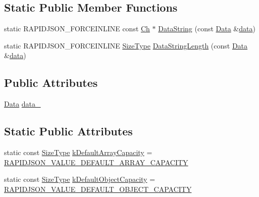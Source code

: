 \subsection*{Static Public Member Functions}
\begin{DoxyCompactItemize}
\item 
static R\+A\+P\+I\+D\+J\+S\+O\+N\+\_\+\+F\+O\+R\+C\+E\+I\+N\+L\+I\+NE const \hyperlink{classGenericValue_ade0e0ce64ccd5d852da57a35e720bafb}{Ch} $\ast$ \hyperlink{classGenericValue_ad5b083fc57cf2d89db29209a18ee72cb}{Data\+String} (const \hyperlink{unionGenericValue_1_1Data}{Data} \&\hyperlink{imgui__impl__opengl3__loader_8h_abd87654504355b4c1bb002dcb1d4d16a}{data})
\item 
static R\+A\+P\+I\+D\+J\+S\+O\+N\+\_\+\+F\+O\+R\+C\+E\+I\+N\+L\+I\+NE \hyperlink{rapidjson_8h_a5ed6e6e67250fadbd041127e6386dcb5}{Size\+Type} \hyperlink{classGenericValue_a1373c36e6bdffc6ed79143f47c1024ee}{Data\+String\+Length} (const \hyperlink{unionGenericValue_1_1Data}{Data} \&\hyperlink{imgui__impl__opengl3__loader_8h_abd87654504355b4c1bb002dcb1d4d16a}{data})
\end{DoxyCompactItemize}
\subsection*{Public Attributes}
\begin{DoxyCompactItemize}
\item 
\hyperlink{unionGenericValue_1_1Data}{Data} \hyperlink{classGenericValue_aaf80f2c91d26fdde60b9edeeecd3509f}{data\+\_\+}
\end{DoxyCompactItemize}
\subsection*{Static Public Attributes}
\begin{DoxyCompactItemize}
\item 
static const \hyperlink{rapidjson_8h_a5ed6e6e67250fadbd041127e6386dcb5}{Size\+Type} \hyperlink{classGenericValue_a188f57bdb1923c1fefe74baa995871a3}{k\+Default\+Array\+Capacity} = \hyperlink{group__RAPIDJSON__CONFIG_ga10ba0ee06d0ac2803d0f2290d46b19f7}{R\+A\+P\+I\+D\+J\+S\+O\+N\+\_\+\+V\+A\+L\+U\+E\+\_\+\+D\+E\+F\+A\+U\+L\+T\+\_\+\+A\+R\+R\+A\+Y\+\_\+\+C\+A\+P\+A\+C\+I\+TY}
\item 
static const \hyperlink{rapidjson_8h_a5ed6e6e67250fadbd041127e6386dcb5}{Size\+Type} \hyperlink{classGenericValue_a284d018914629aed9a4bd97fe2dc5899}{k\+Default\+Object\+Capacity} = \hyperlink{group__RAPIDJSON__CONFIG_ga5c88aa612939b592d15d3fc4bdf54272}{R\+A\+P\+I\+D\+J\+S\+O\+N\+\_\+\+V\+A\+L\+U\+E\+\_\+\+D\+E\+F\+A\+U\+L\+T\+\_\+\+O\+B\+J\+E\+C\+T\+\_\+\+C\+A\+P\+A\+C\+I\+TY}
\end{DoxyCompactItemize}

